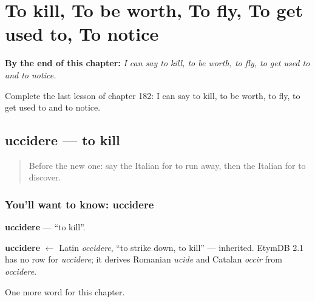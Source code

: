 
\chapter{To kill, To be worth, To fly, To get used to, To notice}
\label{ch:it-to-kill-to-be-worth-to-fly-to-get-used-to-to-notice}

\begin{chapteropening}
\textbf{By the end of this chapter:} \emph{I can say to kill, to be worth, to fly, to get used to and to notice.}

Complete the last lesson of chapter 182: I can say to kill, to be worth, to fly, to get used to and to notice.
\end{chapteropening}

\section[uccidere]{uccidere — to kill}

\label{lesson:IT-C182-uccidere}



\begin{quote}
Before the new one: say the Italian for to run away, then the Italian for to discover.
\end{quote}

\subsection*{You'll want to know: uccidere}
\textbf{uccidere} — \textquotedblleft{}to kill\textquotedblright{}.

\begin{cousinweb}
\textbf{uccidere} $\leftarrow$ Latin \emph{occidere}, \textquotedblleft{}to strike down, to kill\textquotedblright{} — inherited. EtymDB 2.1 has no row for \emph{uccidere}; it derives Romanian \emph{ucide} and Catalan \emph{occir} from \emph{occidere}.
\end{cousinweb}

\begin{grammarlens}[title={What you've built}]
One more word for this chapter.
\end{grammarlens}

